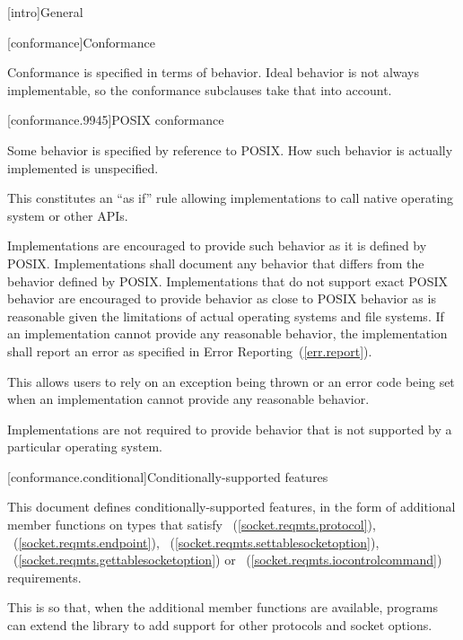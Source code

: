 
[intro]{General}

[conformance]{Conformance}

\pnum
 Conformance is specified in terms of behavior. Ideal behavior is not always implementable, so the conformance subclauses take that into account.


[conformance.9945]{POSIX conformance}

\pnum
 Some behavior is specified by reference to POSIX. How such behavior is actually implemented is unspecified.

\pnum
 \begin{note} This constitutes an ``as if'' rule allowing implementations to call native operating system or other APIs. \end{note}

\pnum
Implementations are encouraged to provide such behavior as it is defined by POSIX. Implementations shall document any behavior that differs from the behavior defined by POSIX. Implementations that do not support exact POSIX behavior are encouraged to provide behavior as close to POSIX behavior as is reasonable given the limitations of actual operating systems and file systems. If an implementation cannot provide any reasonable behavior, the implementation shall report an error as specified in Error Reporting~(\ref{err.report}).

\pnum
 \begin{note} This allows users to rely on an exception being thrown or an error code being set when an implementation cannot provide any reasonable behavior. \end{note}

\pnum
 Implementations are not required to provide behavior that is not supported by a particular operating system.



[conformance.conditional]{Conditionally-supported features}

\pnum
This document defines conditionally-supported features, in the form of additional member functions on types that satisfy ~(\ref{socket.reqmts.protocol}), ~(\ref{socket.reqmts.endpoint}), ~(\ref{socket.reqmts.settablesocketoption}), ~(\ref{socket.reqmts.gettablesocketoption}) or ~(\ref{socket.reqmts.iocontrolcommand}) requirements.

\pnum
 \begin{note} This is so that, when the additional member functions are available, \Cpp programs can extend the library to add support for other protocols and socket options. \end{note}


